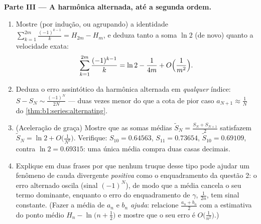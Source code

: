 \begin{problem}[{Problema de fim de semana --- $H_n = \ln n + \gamma +
\frac{1}{2n} + O(n^{-2})$, e rearranjar $1 - \frac12 +
\frac13 - \dots$ para $\frac{\ln 2}{2}$}]
\medskip
\noindent\textbf{Parte III --- A  harmônica alternada,
até a segunda ordem.}
\begin{enumerate}[resume]
  \item Mostre (por indução, ou agrupando) a identidade
        $\sum_{k=1}^{2m} \frac{(-1)^{k-1}}{k} = H_{2m} - H_m$,
        e deduza tanto a soma $\ln 2$ (de novo) quanto a velocidade
        exata:
        \[
        \sum_{k=1}^{2m} \frac{(-1)^{k-1}}{k}
        = \ln 2 - \frac{1}{4m} + O\Bigl(\frac{1}{m^2}\Bigr) .
        \]
  \item Deduza o erro assintótico da  harmônica alternada em
        \emph{qualquer} índice: $S - S_N \sim
        \frac{(-1)^N}{2N}$ --- duas vezes menor do que a
        cota de pior caso $a_{N+1} \approx \frac1N$ do \cref{thm:b1:series:alternating}.
  \item (Aceleração de graça) Mostre que as somas médias
        $\tilde S_N = \frac{S_N + S_{N+1}}{2}$ satisfazem $\tilde
        S_N = \ln 2 + O\bigl(\frac{1}{N^2}\bigr)$. Verifique: $S_{10}
        = 0.64563$, $S_{11} = 0.73654$, $\tilde S_{10} =
        0.69109$,
        contra $\ln 2 = 0.69315$: uma única média compra duas casas decimais.
  \item Explique em duas frases por que nenhum truque desse tipo
        pode ajudar um fenômeno de cauda divergente \emph{positiva}
        como o enquadramento da questão 2: o erro alternado oscila
        (sinal $(-1)^N$), de modo que a média cancela o seu termo
        dominante, enquanto o erro do enquadramento de $\gamma$,
        $\frac{1}{2n}$, tem sinal constante. (Fazer a média de $a_n$ e $b_n$
        \emph{ajuda}: relacione $\frac{a_n + b_n}{2}$ com a estimativa do ponto
        médio $H_n - \ln\bigl(n + \frac12\bigr)$ e mostre que o seu erro é $O\bigl(\frac{1}{n^2}\bigr)$.)
\end{enumerate}


\end{problem}
